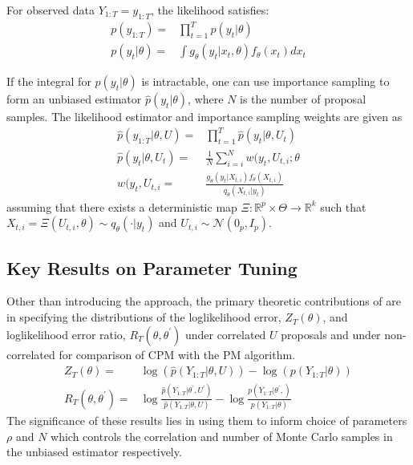 \documentclass{article}
\begin{document}
For observed data $Y_{1:T}=y_{1:T}$, the likelihood satisfies:
\begin{align*}
p(y_{1:T})=& \prod_{t=1}^{T} p(y_t|\theta) \\
p(y_t| \theta)=& \int g_\theta(y_t|x_t,\theta)f_\theta(x_t) dx_t
\end{align*}

If the integral for $p(y_t| \theta)$ is intractable, one can use importance sampling to form an unbiased estimator $\hat{p}(y_t| \theta)$, where $N$ is the number of proposal samples. The likelihood estimator and importance sampling weights are given as
\begin{align*}
\hat{p}(y_{1:T}| \theta, U) =& \prod_{t=1}^{T} \hat{p}(y_t|\theta, U_t) \\
\hat{p}(y_t| \theta, U_t)=& \frac{1}{N} \sum_{i=i}^N w(y_t, U_{t,i}; \theta \\
w(y_t, U_{t,i} =& \frac{g_\theta(y_t|X_{t,i})f_\theta(X_{t,i})}{q_\theta(X_{t,i}|y_t)}
\end{align*}
assuming that there exists a deterministic map $ \Xi: \mathbb{R}^p \times \Theta \rightarrow \mathbb{R}^k$ such that $X_{t,i} = \Xi(U_{t,i}, \theta) \sim q_\theta(\cdot|y_t)$ and $U_{t,i} \sim \mathcal{N}(0_p, I_p) $.

\subsection{Key Results on Parameter Tuning}

Other than introducing the approach, the primary theoretic contributions of \cite{cpmmDeligiannidis2015} are in specifying the distributions of the loglikelihood error, $Z_T(\theta)$, and loglikelihood error ratio, $R_T(\theta, \theta^\prime)$ under correlated $U$ proposals and under non-correlated for comparison of CPM with the PM algorithm.
\begin{align*}
Z_T(\theta) =& \log(\hat{p}(Y_{1:T}| \theta, U)) - \log(p(Y_{1:T}|\theta)) \\
R_T(\theta, \theta^\prime) =& \log \frac{\hat{p}(Y_{1:T}| \theta^\prime, U^\prime)}{\hat{p}(Y_{1:T}| \theta, U)} - \log \frac{p(Y_{1:T}| \theta^\prime,)}{p(Y_{1:T}| \theta)}
\end{align*}
The significance of these results lies in using them to inform choice of parameters $\rho$ and $N$ which controls the correlation and number of Monte Carlo samples in the unbiased estimator respectively. \\
\end{document}
